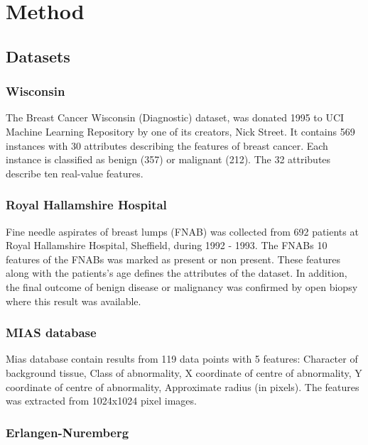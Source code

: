 \chapter{Method}

\section{Datasets}
\label{sec:Datasets}



\subsection{Wisconsin}

The Breast Cancer Wisconsin (Diagnostic) dataset, was donated 1995 to UCI  Machine Learning Repository \parencite{dua:2017} by one of its creators, Nick Street. It contains 569 instances with 30 attributes describing the features of breast cancer. Each instance is classified as benign (357) or malignant (212). The 32 attributes describe ten real-value features.

\subsection{Royal Hallamshire Hospital}

Fine needle aspirates of breast lumps (FNAB) was collected from 692 patients at Royal Hallamshire Hospital, Sheffield, during 1992 - 1993. The FNABs 10 features of the FNABs was marked as present or non present. These features along with the patients's age defines the attributes of the dataset. In addition, the final outcome of benign disease or malignancy was confirmed by open biopsy where this result was available.

\subsection{MIAS database}

Mias database contain results from 119 data points with 5 features: Character of background tissue, Class of abnormality, X coordinate of centre of abnormality, Y coordinate of centre of abnormality, Approximate radius (in pixels). The features was extracted from 1024x1024 pixel images.

\subsection{Erlangen-Nuremberg}

